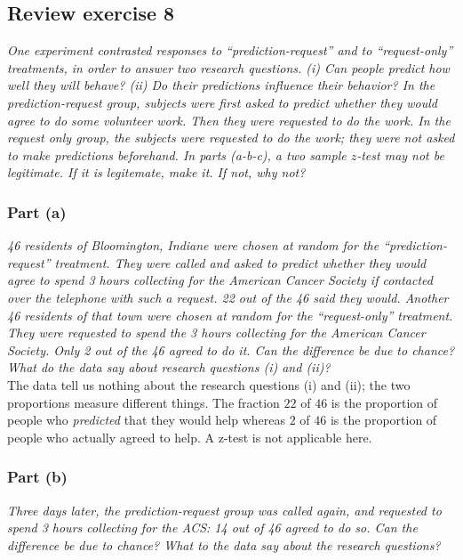 \documentclass[11pt]{article}
\begin{document}
\subsection*{Review exercise 8} %
\noindent \textit{One experiment contrasted responses to ``prediction-request'' and to ``request-only'' treatments, in order to answer two research questions. (i) Can people predict how well they will behave? (ii) Do their predictions influence their behavior? In the prediction-request group, subjects were first asked to predict whether they would agree to do some volunteer work. Then they were requested to do the work. In the request only group, the subjects were requested to do the work; they were not asked to make predictions beforehand. In parts (a-b-c), a two sample $z$-test may not be legitimate. If it is legitemate, make it. If not, why not?}
\subsubsection*{Part (a)}
\noindent \textit{46 residents of Bloomington, Indiane were chosen at random for the ``prediction-request'' treatment. They were called and asked to predict whether they would agree to spend 3 hours collecting for the American Cancer Society if contacted over the telephone with such a request. 22 out of the 46 said they would. Another 46 residents of that town were chosen at random for the ``request-only'' treatment. They were requested to spend the 3 hours collecting for the American Cancer Society. Only 2 out of the 46 agreed to do it. Can the difference be due to chance? What do the data say about research questions (i) and (ii)?}\\

The data tell us nothing about the research questions (i) and (ii); the two proportions measure different things.  The fraction $22$ of $46$ is the proportion of people who \textit{predicted} that they would help whereas $2$ of $46$ is the proportion of people who actually agreed to help.  A z-test is not applicable here.

\subsubsection*{Part (b)}
\noindent \textit{Three days later, the prediction-request group was called again, and requested to spend 3 hours collecting for the ACS: 14 out of 46 agreed to do so. Can the difference be due to chance? What to the data say about the research questions?}\\
\end{document}
